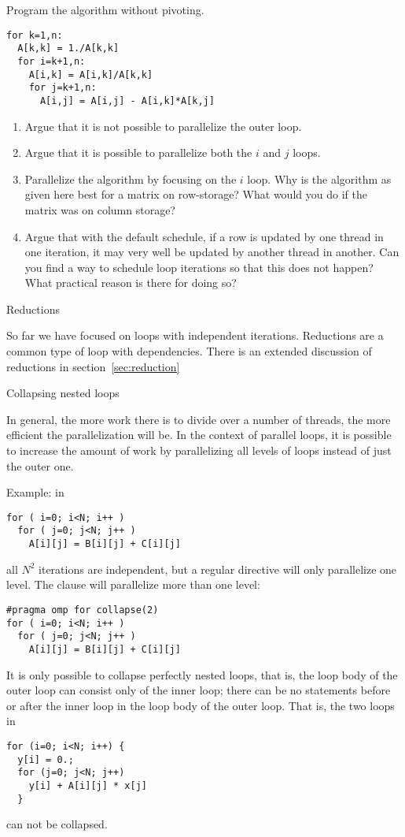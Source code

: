 \begin{exercise}
  Program the  algorithm without pivoting.
\begin{verbatim}
for k=1,n:
  A[k,k] = 1./A[k,k]
  for i=k+1,n:
    A[i,k] = A[i,k]/A[k,k]
    for j=k+1,n:
      A[i,j] = A[i,j] - A[i,k]*A[k,j]
\end{verbatim}
\begin{enumerate}
\item Argue that it is not possible to parallelize the outer loop.
\item Argue that it is possible to parallelize both the $i$ and $j$ loops.
\item Parallelize the algorithm by focusing on the $i$ loop. Why is the algorithm as given here best
  for a matrix on row-storage? What would you do if the matrix was on column storage?
\item Argue that with the default schedule, if a row is updated by one thread in one iteration,
  it may very well be updated by another thread in another. Can you find a way to schedule
  loop iterations so that this does not happen? What practical reason is there for doing so?
\end{enumerate}
\end{exercise}

 {Reductions}

So far we have focused on loops with independent iterations.
Reductions are a common type of loop with dependencies.
There is an extended discussion of reductions in section~\ref{sec:reduction}

 {Collapsing nested loops}

In general, the more work there is to divide over a number of threads,
the more efficient the parallelization will be. In the context of
parallel loops, it is possible to increase the amount of work by
parallelizing all levels of loops instead of just the outer one.

Example: in
\begin{verbatim}
for ( i=0; i<N; i++ )
  for ( j=0; j<N; j++ )
    A[i][j] = B[i][j] + C[i][j] 
\end{verbatim}
all $N^2$ iterations are independent, but a regular 
directive will only parallelize one level. The 
clause will parallelize more than one level:
\begin{verbatim}
#pragma omp for collapse(2)
for ( i=0; i<N; i++ )
  for ( j=0; j<N; j++ )
    A[i][j] = B[i][j] + C[i][j] 
\end{verbatim}
It is only possible to collapse perfectly nested loops, that is, the
loop body of the outer loop can consist only of the inner loop; there
can be no statements before or after the inner loop in the loop body
of the outer loop. That is, the two loops in
\begin{verbatim}
for (i=0; i<N; i++) {
  y[i] = 0.;
  for (j=0; j<N; j++)
    y[i] + A[i][j] * x[j]
  }
\end{verbatim}
can not be collapsed.

